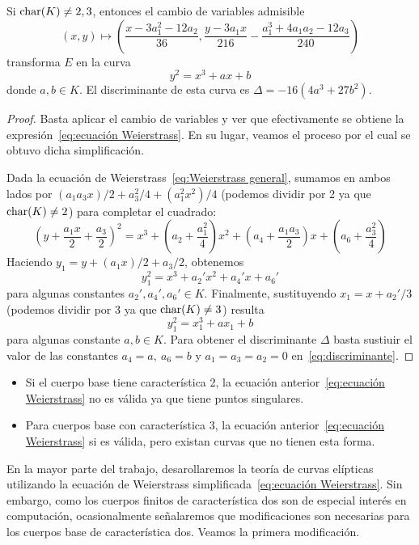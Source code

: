 \begin{lema}\label{lm: simplificación ecuación Weierstrass}
	Si $\operatorname{char}(K) \neq 2, 3$, entonces el cambio de variables admisible
	$$
	(x, y) \mapsto \left(\frac{x - 3 a_1^2 - 12 a_2}{36}, \frac{y - 3 a_1 x}{216} - \frac{a_1^3 + 4 a_1 a_2 - 12 a_3}{240}\right)
	$$
	transforma $E$ en la curva
	\begin{equation}\label{eq:ecuación Weierstrass}
		y^2 = x^3 + a x + b
	\end{equation}
	donde $a, b \in K$. El discriminante de esta curva es $\Delta = -16(4a^3 + 27b^2)$.
\end{lema}
\begin{proof}
Basta aplicar el cambio de variables y ver que efectivamente se obtiene la expresión~\eqref{eq:ecuación Weierstrass}. En su lugar, veamos el proceso por el cual se obtuvo dicha simplificación.

Dada la ecuación de Weierstrass~\eqref{eq:Weierstrass general}, sumamos en ambos lados por $(a_1 a_3 x)/2 + a_3^2/4 + (a_1^2 x^2)/4$ (podemos dividir por 2 ya que $\operatorname{char}(K) \neq 2$) para completar el cuadrado:
$$
\left(y + \frac{a_1 x}{2} + \frac{a_3}{2}\right)^2 = x^3 + \left(a_2 + \frac{a_1^2}{4}\right)x^2 + \left(a_4 + \frac{a_1 a_3}{2}\right)x + \left(a_6 + \frac{a_3^2}{4}\right)
$$
Haciendo $y_1 = y + (a_1 x)/2 + a_3/2$, obtenemos
$$
y_1^2 = x^3 + a_2' x^2 + a_4' x + a_6'
$$
para algunas constantes $a_2', a_4', a_6' \in K$. Finalmente, sustituyendo $x_1 = x + a_2'/3$ (podemos dividir por 3 ya que $\operatorname{char}(K) \neq 3$) resulta
$$
y_1^2 = x_1^3 + a x_1 + b
$$
para algunas constante $a, b \in K$. Para obtener el discriminante $\Delta$ basta sustiuir el valor de las constantes $a_4 = a,\ a_6 = b$ y $a_1 = a_3 = a_2 = 0$ en~\eqref{eq:discriminante}.
\end{proof}
\begin{nota} \leavevmode
	\begin{itemize}
		\item Si el cuerpo base tiene característica 2, la ecuación anterior~\eqref{eq:ecuación Weierstrass} no es válida ya que tiene puntos singulares.
		\item Para cuerpos base con característica 3, la ecuación anterior~\eqref{eq:ecuación Weierstrass} si es válida, pero existan curvas que no tienen esta forma.
	\end{itemize}
\end{nota}

En la mayor parte del trabajo, desarollaremos la teoría de curvas elípticas utilizando la ecuación de Weierstrass simplificada~\eqref{eq:ecuación Weierstrass}. Sin embargo, como los cuerpos finitos de característica dos son de especial interés en computación, ocasionalmente señalaremos que modificaciones son necesarias para los cuerpos base de característica dos. Veamos la primera modificación.


